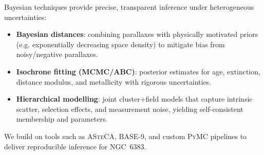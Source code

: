 \documentclass[../main.tex]{subfiles}
\begin{document}
Bayesian techniques provide precise, transparent inference under heterogeneous uncertainties:
\begin{itemize}
  \item \textbf{Bayesian distances}: combining parallaxes with physically motivated priors (e.g. exponentially decreasing space density) to mitigate bias from noisy/negative parallaxes.
  \item \textbf{Isochrone fitting (MCMC/ABC)}: posterior estimates for age, extinction, distance modulus, and metallicity with rigorous uncertainties.
  \item \textbf{Hierarchical modelling}: joint cluster+field models that capture intrinsic scatter, selection effects, and measurement noise, yielding self-consistent membership and parameters.
\end{itemize}
We build on tools such as \textsc{ASteCA}, \textsc{BASE-9}, and custom \textsc{PyMC} pipelines to deliver reproducible inference for NGC~6383.

\biblio
\end{document}
